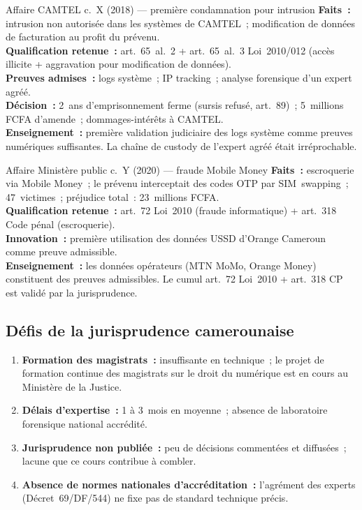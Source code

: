 \begin{boxscenario}{Affaire CAMTEL c.~X (2018) --- première condamnation pour intrusion}
\textbf{Faits~:} intrusion non autorisée dans les systèmes de CAMTEL~;
modification de données de facturation au profit du prévenu.\\
\textbf{Qualification retenue~:} art.~65~al.~2 + art.~65~al.~3
Loi~2010/012 (accès illicite + aggravation pour modification de données).\\
\textbf{Preuves admises~:} logs système~; IP tracking~; analyse forensique
d'un expert agréé.\\
\textbf{Décision~:} 2~ans d'emprisonnement ferme (sursis refusé, art.~89)~;
5~millions FCFA d'amende~; dommages-intérêts à CAMTEL.\\
\textbf{Enseignement~:} première validation judiciaire des logs système
comme preuves numériques suffisantes. La chaîne de custody de l'expert
agréé était irréprochable.
\end{boxscenario}

\begin{boxscenario}{Affaire Ministère public c.~Y (2020) --- fraude Mobile Money}
\textbf{Faits~:} escroquerie via Mobile Money~; le prévenu interceptait
des codes OTP par SIM~swapping~; 47~victimes~; préjudice total~:
23~millions FCFA.\\
\textbf{Qualification retenue~:} art.~72 Loi~2010 (fraude informatique)
+ art.~318 Code pénal (escroquerie).\\
\textbf{Innovation~:} première utilisation des données USSD d'Orange
Cameroun comme preuve admissible.\\
\textbf{Enseignement~:} les données opérateurs (MTN MoMo, Orange Money)
constituent des preuves admissibles. Le cumul art.~72 Loi~2010 + art.~318
CP est validé par la jurisprudence.
\end{boxscenario}

\subsection{Défis de la jurisprudence camerounaise}

\begin{enumerate}
    \item \textbf{Formation des magistrats~:} insuffisante en technique~;
          le projet de formation continue des magistrats sur le droit du
          numérique est en cours au Ministère de la Justice.
    \item \textbf{Délais d'expertise~:} 1 à 3~mois en moyenne~;
          absence de laboratoire forensique national accrédité.
    \item \textbf{Jurisprudence non publiée~:} peu de décisions commentées
          et diffusées~; lacune que ce cours contribue à combler.
    \item \textbf{Absence de normes nationales d'accréditation~:}
          l'agrément des experts (Décret~69/DF/544) ne fixe pas de
          standard technique précis.
\end{enumerate}

